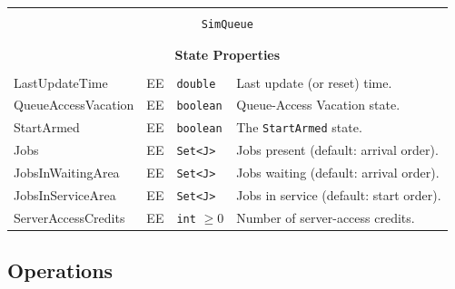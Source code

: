 \documentclass[12pt]{book}
\begin{document}
\begin{tabular}{|l|l|l|l|}
\hline
\multicolumn{4}{|c|}{} \\
\multicolumn{4}{|c|}{\lstinline[basicstyle=\large]{SimQueue}} \\
\multicolumn{4}{|c|}{} \\
\hline
\multicolumn{4}{|c|}{} \\
\multicolumn{4}{|c|}{\bf State Properties} \\
\multicolumn{4}{|c|}{} \\
\hline
LastUpdateTime & EE & \lstinline|double| & Last update (or reset) time. \\
\hline
QueueAccessVacation & EE & \lstinline|boolean| & Queue-Access Vacation state. \\
\hline
StartArmed & EE & \lstinline|boolean| & The \lstinline|StartArmed| state. \\
\hline
Jobs & EE & \lstinline|Set<J>| & Jobs present (default: arrival order). \\
\hline
JobsInWaitingArea & EE & \lstinline|Set<J>| & Jobs waiting (default: arrival order). \\
\hline
JobsInServiceArea & EE & \lstinline|Set<J>| & Jobs in service (default: start order). \\
\hline
ServerAccessCredits & EE & \lstinline|int| $\geq 0$ & Number of server-access credits. \\
\hline
\end{tabular}

\subsection{Operations}
\end{document}
